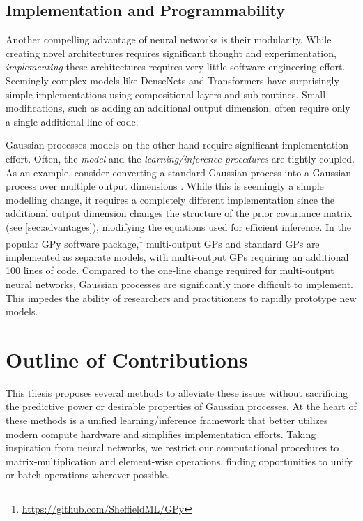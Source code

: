 \subsection{Implementation and Programmability}
Another compelling advantage of neural networks is their modularity.
While creating novel architectures requires significant thought and experimentation, \emph{implementing} these architectures requires very little software engineering effort.
Seemingly complex models like DenseNets \cite{huang2017densely} and Transformers \cite{vaswani2017attention} have surprisingly simple implementations using compositional layers and sub-routines.
Small modifications, such as adding an additional output dimension, often require only a single additional line of code.

Gaussian processes models on the other hand require significant implementation effort.
Often, the \emph{model} and the \emph{learning/inference procedures} are tightly coupled.
As an example, consider converting a standard Gaussian process into a Gaussian process over multiple output dimensions \cite{bonilla2008multi}.
While this is seemingly a simple modelling change, it requires a completely different implementation since the additional output dimension changes the structure of the prior covariance matrix (see \cref{sec:advantages}), modifying the equations used for efficient inference.
In the popular GPy software package,\footnote{
	\url{https://github.com/SheffieldML/GPy}
} multi-output GPs and standard GPs are implemented as separate models, with multi-output GPs requiring an additional 100 lines of code.
Compared to the one-line change required for multi-output neural networks, Gaussian processes are significantly more difficult to implement.
This impedes the ability of researchers and practitioners to rapidly prototype new models.



\section{Outline of Contributions}
This thesis proposes several methods to alleviate these issues without sacrificing the predictive power or desirable properties of Gaussian processes.
At the heart of these methods is a unified learning/inference framework that better utilizes modern compute hardware and simplifies implementation efforts.
Taking inspiration from neural networks, we restrict our computational procedures to matrix-multiplication and element-wise operations, finding opportunities to unify or batch operations wherever possible.

